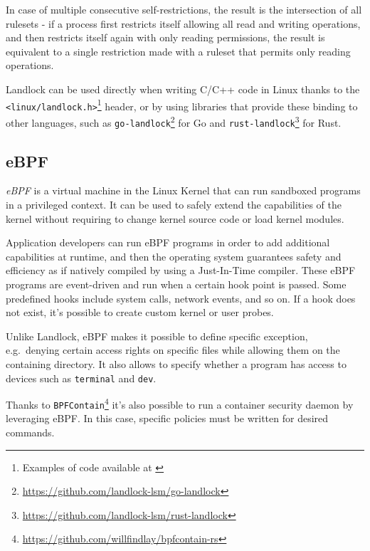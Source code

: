 In case of multiple consecutive self-restrictions, the result is the intersection
of all rulesets - if a process first restricts itself allowing all read and writing operations,
and then restricts itself again with only reading permissions, the result is equivalent
to a single restriction made with a ruleset that permits only reading operations.

Landlock can be used directly when writing C/C++ code in Linux thanks to the
\texttt{<linux/landlock.h>}\footnote{Examples of code available at \cite{landlock-user-space}}
header, or by using libraries that provide these binding to other languages,
such as \texttt{go-landlock}\footnote{\url{https://github.com/landlock-lsm/go-landlock}}
for Go and \texttt{rust-landlock}\footnote{\url{https://github.com/landlock-lsm/rust-landlock}} for Rust.

\subsection{eBPF}
\textit{eBPF} \cite{ebpf} is a virtual machine in the Linux Kernel that can run sandboxed programs
in a privileged context. It can be used to safely extend the capabilities of the kernel
without requiring to change kernel source code or load kernel modules.

Application developers can run eBPF programs in order to add additional capabilities at runtime,
and then the operating system guarantees safety and efficiency as if natively compiled
by using a Just-In-Time compiler.
These eBPF programs are event-driven and run when a certain hook point is passed. Some
predefined hooks include system calls, network events, and so on. If a hook does not exist,
it's possible to create custom kernel or user probes.

Unlike Landlock, eBPF makes it possible to define specific exception, e.g.\ denying
certain access rights on specific files while allowing them on the containing directory.
It also allows to specify whether a program has access to devices such as \texttt{terminal}
and \texttt{dev}.

Thanks to \texttt{BPFContain}\footnote{\url{https://github.com/willfindlay/bpfcontain-rs}}
it's also possible to run a container security daemon by leveraging eBPF.  In this case,
specific policies must be written for desired commands.
